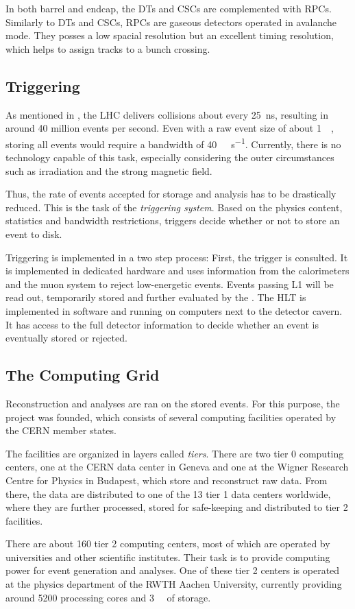In both barrel and endcap, the \acp{DT} and \acp{CSC} are complemented with \acp{RPC}. Similarly to \acp{DT} and \acp{CSC}, \acp{RPC} are gaseous detectors operated in avalanche mode. They posses a low spacial resolution but an excellent timing resolution, which helps to assign tracks to a bunch crossing.

\subsection{Triggering}
\label{sec:triggering}
As mentioned in , the \ac{LHC} delivers collisions about every \SI{25}{\nano\second}, resulting in around \num{40} million events per second. Even with a raw event size of about \SI{1}{\mega\byte}, storing all events would require a bandwidth of \SI{40}{\tera\byte\per\second}. Currently, there is no technology capable of this task, especially considering the outer circumstances such as irradiation and the strong magnetic field.

Thus, the rate of events accepted for storage and analysis has to be drastically reduced. This is the task of the \emph{triggering system}. Based on the physics content, statistics and bandwidth restrictions, triggers decide whether or not to store an event to disk.

Triggering is implemented in a two step process: First, the  trigger is consulted. It is implemented in dedicated hardware and uses information from the calorimeters and the muon system to reject low-energetic events. Events passing \ac{L1} will be read out, temporarily stored and further evaluated by the . The \ac{HLT} is implemented in software and running on computers next to the detector cavern. It has access to the full detector information to decide whether an event is eventually stored or rejected.

\subsection{The Computing Grid}
Reconstruction and analyses are ran on the stored events. For this purpose, the  project was founded, which consists of several computing facilities operated by the \ac{CERN} member states.

The facilities are organized in layers called \emph{tiers}. There are two tier 0 computing centers, one at the \ac{CERN} data center in Geneva and one at the Wigner Research Centre for Physics in Budapest, which store and reconstruct raw data. From there, the data are distributed to one of the 13 tier 1 data centers worldwide, where they are further processed, stored for safe-keeping and distributed to tier 2 facilities.

There are about 160 tier 2 computing centers, most of which are operated by universities and other scientific institutes. Their task is to provide computing power for event generation and analyses\cite{CERN:Gridsystemtiers,WLCG:Tiercentres}. One of these tier 2 centers is operated at the physics department of the RWTH Aachen University, currently providing around \num{5200} processing cores and \SI{3}{\peta\byte} of storage\cite{UniRWTHAachenIII.PhysikalischesInstitut:GridComputing}. 
